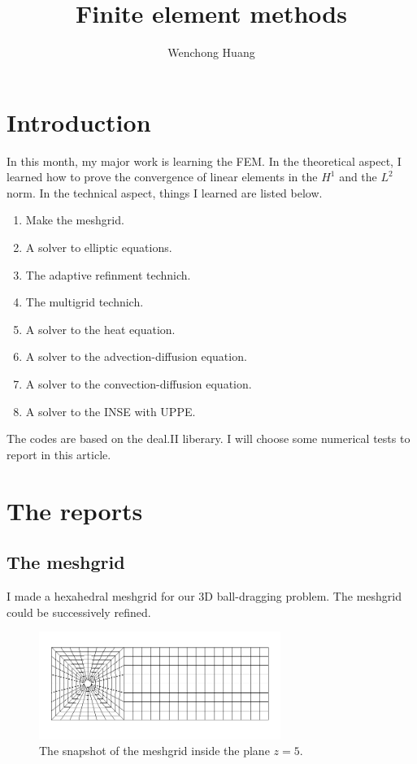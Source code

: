 \documentclass[lang=en,11pt,a4paper,bibend=bibtex]{elegantpaper}
\title{Finite element methods}
\author{Wenchong Huang}
\begin{document}
\maketitle

\section{Introduction}

In this month, my major work is learning the FEM.
In the theoretical aspect, I learned how to prove the convergence of 
linear elements in the $H^1$ and the $L^2$ norm. 
In the technical aspect, things I learned are listed below.

\begin{enumerate}
    \item Make the meshgrid.
    \item A solver to elliptic equations.
    \item The adaptive refinment technich.
    \item The multigrid technich.
    \item A solver to the heat equation.
    \item A solver to the advection-diffusion equation.
    \item A solver to the convection-diffusion equation.
    \item A solver to the INSE with UPPE.
\end{enumerate}

The codes are based on the deal.II liberary. 
I will choose some numerical tests to report in this article.


\section{The reports}

\subsection{The meshgrid}

I made a hexahedral meshgrid for our 3D ball-dragging problem.
The meshgrid could be successively refined.

\begin{figure}[H]
    \centering
    \includegraphics[width=0.7\textwidth]{png/level2_z=5.png}
    \caption{The snapshot of the meshgrid inside the plane $z=5$.}
\end{figure}
\end{document}
